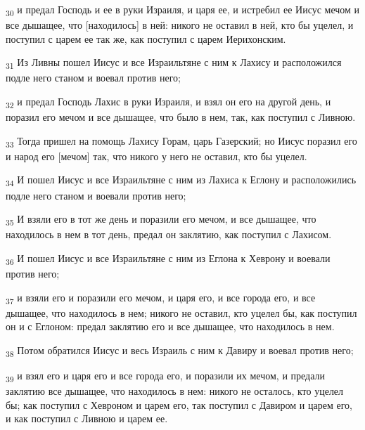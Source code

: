 \begin{tcolorbox}
\textsubscript{30} и предал Господь и ее в руки Израиля, и царя ее, и истребил ее Иисус мечом и все дышащее, что [находилось] в ней: никого не оставил в ней, кто бы уцелел, и поступил с царем ее так же, как поступил с царем Иерихонским.
\end{tcolorbox}
\begin{tcolorbox}
\textsubscript{31} Из Ливны пошел Иисус и все Израильтяне с ним к Лахису и расположился подле него станом и воевал против него;
\end{tcolorbox}
\begin{tcolorbox}
\textsubscript{32} и предал Господь Лахис в руки Израиля, и взял он его на другой день, и поразил его мечом и все дышащее, что было в нем, так, как поступил с Ливною.
\end{tcolorbox}
\begin{tcolorbox}
\textsubscript{33} Тогда пришел на помощь Лахису Горам, царь Газерский; но Иисус поразил его и народ его [мечом] так, что никого у него не оставил, кто бы уцелел.
\end{tcolorbox}
\begin{tcolorbox}
\textsubscript{34} И пошел Иисус и все Израильтяне с ним из Лахиса к Еглону и расположились подле него станом и воевали против него;
\end{tcolorbox}
\begin{tcolorbox}
\textsubscript{35} И взяли его в тот же день и поразили его мечом, и все дышащее, что находилось в нем в тот день, предал он заклятию, как поступил с Лахисом.
\end{tcolorbox}
\begin{tcolorbox}
\textsubscript{36} И пошел Иисус и все Израильтяне с ним из Еглона к Хеврону и воевали против него;
\end{tcolorbox}
\begin{tcolorbox}
\textsubscript{37} и взяли его и поразили его мечом, и царя его, и все города его, и все дышащее, что находилось в нем; никого не оставил, кто уцелел бы, как поступил он и с Еглоном: предал заклятию его и все дышащее, что находилось в нем.
\end{tcolorbox}
\begin{tcolorbox}
\textsubscript{38} Потом обратился Иисус и весь Израиль с ним к Давиру и воевал против него;
\end{tcolorbox}
\begin{tcolorbox}
\textsubscript{39} и взял его и царя его и все города его, и поразили их мечом, и предали заклятию все дышащее, что находилось в нем: никого не осталось, кто уцелел бы; как поступил с Хевроном и царем его, так поступил с Давиром и царем его, и как поступил с Ливною и царем ее.
\end{tcolorbox}
